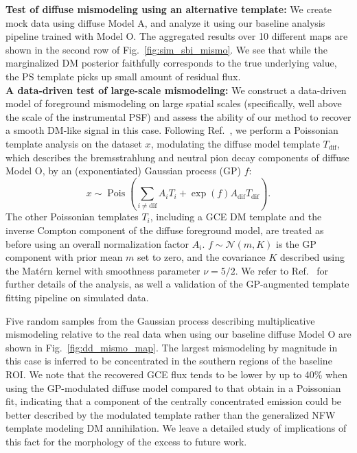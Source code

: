 \documentclass[prd,aps,10pt,nofootinbib,twocolumn,superscriptaddress,preprintnumbers,balancelastpage,longbibliography]{revtex4-1}
\begin{document}
\noindent
\textbf{Test of diffuse mismodeling using an alternative template:}
We create mock data using diffuse Model A, and analyze it using our baseline analysis pipeline trained with Model O. The aggregated results over 10 different maps are shown in the second row of Fig.~\ref{fig:sim_sbi_mismo}. We see that while the marginalized DM posterior faithfully corresponds to the true underlying value, the PS template picks up small amount of residual flux. \\

\noindent
\textbf{A data-driven test of large-scale mismodeling:}
We construct a data-driven model of foreground mismodeling on large spatial scales (specifically, well above the scale of the instrumental PSF) and assess the ability of our method to recover a smooth DM-like signal in this case. Following Ref.~\cite{Mishra-Sharma:2020kjb}, we perform a Poissonian template analysis on the \Fermi dataset $x$, modulating the diffuse model template $T_{\mathrm{dif}}$, which describes the bremsstrahlung and neutral pion decay components of diffuse Model O, by an (exponentiated) Gaussian process (GP) $f$:
\begin{equation}
x \sim \operatorname{Pois}\left(\sum_{i \neq \mathrm{dif}} A_{i} T_{i}+\exp \left(f\right) A_{\mathrm{dif}} T_{\mathrm{dif}}\right).
\end{equation}
The other Poissonian templates $T_{i}$, including a GCE DM template and the inverse Compton component of the diffuse foreground model, are treated as before using an overall normalization factor $A_{i}$. $f \sim \mathcal{N}(m, K)$ is the GP component with prior mean $m$ set to zero, and the covariance $K$ described using the Mat\'ern kernel with smoothness parameter $\nu = 5/2$. We refer to Ref.~\cite{Mishra-Sharma:2020kjb} for further details of the analysis, as well a validation of the GP-augmented template fitting pipeline on simulated data.

Five random samples from the Gaussian process describing multiplicative mismodeling relative to the real \Fermi data when using our baseline diffuse Model O are shown in Fig.~\ref{fig:dd_mismo_map}. The largest mismodeling by magnitude in this case is inferred to be concentrated in the southern regions of the baseline ROI. We note that the recovered GCE flux tends to be lower by up to 40\% when using the GP-modulated diffuse model compared to that obtain in a Poissonian fit, indicating that a component of the centrally concentrated emission could be better described by the modulated template rather than the generalized NFW template modeling DM annihilation. We leave a detailed study of implications of this fact for the morphology of the excess to future work.
\end{document}
